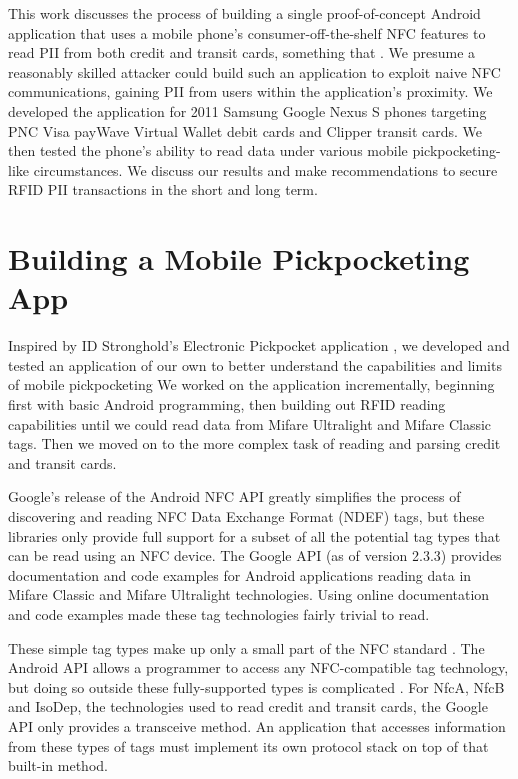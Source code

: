 \documentclass{IEEEtran}
\begin{document}
This work discusses the process of building a single proof-of-concept Android application that uses a mobile phone's consumer-off-the-shelf NFC features to read PII from both credit and transit cards, something that .  We presume a reasonably skilled attacker could build such an application to exploit naive NFC communications, gaining PII from users within the application's proximity.  We developed the application for 2011 Samsung Google Nexus S phones targeting PNC Visa payWave Virtual Wallet debit cards and Clipper transit cards.  We then tested the phone's ability to read data under various mobile pickpocketing-like circumstances.  We discuss our results and make recommendations to secure RFID PII transactions in the short and long term.  

\section{Building a Mobile Pickpocketing App}
Inspired by ID Stronghold's Electronic Pickpocket application \cite{google-play-idstronghold}, we developed and tested an application of our own to better understand the capabilities and limits of mobile pickpocketing   We worked on the application incrementally, beginning first with basic Android programming, then building out RFID reading capabilities until we could read data from Mifare Ultralight and Mifare Classic tags.  Then we moved on to the more complex task of reading and parsing credit and transit cards.    

Google's release of the Android NFC API greatly simplifies the process of discovering and reading NFC Data Exchange Format (NDEF) tags, but these libraries only provide full support for a subset of all the potential tag types that can be read using an NFC device. The Google API (as of version 2.3.3) provides documentation and code examples for Android applications reading data in Mifare Classic and Mifare Ultralight technologies.  Using online documentation and code examples \cite{mifare-classic-detection-android} made these tag technologies fairly trivial to read.

These simple tag types make up only a small part of the NFC standard \cite{opennfc-1}.  The Android API allows a programmer to access any NFC-compatible tag technology, but doing so outside these fully-supported types is complicated \cite{android-developers-advanced-nfc}.  For NfcA, NfcB and IsoDep, the technologies used to read credit and transit cards, the Google API only provides a transceive method.  An application that  accesses information from these types of tags must implement its own protocol stack on top of that built-in method.
\end{document}
